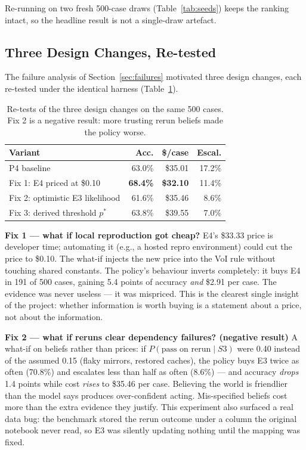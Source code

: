 \documentclass{article}
\begin{document}
Re-running on two fresh 500-case draws (Table~\ref{tab:seeds}) keeps the ranking intact, so the headline result is not a single-draw artefact.

\subsection{Three Design Changes, Re-tested}

The failure analysis of Section~\ref{sec:failures} motivated three design changes, each re-tested under the identical harness (Table~\ref{tab:whatif}).

\begin{table}[t]
\centering
\small
\begin{tabular}{lrrr}
\toprule
Variant & Acc. & \$/case & Escal. \\
\midrule
P4 baseline & 63.0\% & \$35.01 & 17.2\% \\
Fix 1: E4 priced at \$0.10 & \textbf{68.4\%} & \textbf{\$32.10} & 11.4\% \\
Fix 2: optimistic E3 likelihood & 61.6\% & \$35.46 & 8.6\% \\
Fix 3: derived threshold $p^*$ & 63.8\% & \$39.55 & 7.0\% \\
\bottomrule
\end{tabular}
\caption{Re-tests of the three design changes on the same 500 cases. Fix 2 is a negative result: more trusting rerun beliefs made the policy worse.}
\label{tab:whatif}
\end{table}

\textbf{Fix 1 --- what if local reproduction got cheap?} E4's \$33.33 price is developer time; automating it (e.g., a hosted repro environment) could cut the price to \$0.10. The what-if injects the new price into the VoI rule without touching shared constants. The policy's behaviour inverts completely: it buys E4 in 191 of 500 cases, gaining 5.4 points of accuracy \emph{and} \$2.91 per case. The evidence was never useless --- it was mispriced. This is the clearest single insight of the project: whether information is worth buying is a statement about a price, not about the information.

\textbf{Fix 2 --- what if reruns clear dependency failures? (negative result)} A what-if on beliefs rather than prices: if $P(\text{pass on rerun} \mid S3)$ were 0.40 instead of the assumed 0.15 (flaky mirrors, restored caches), the policy buys E3 twice as often (70.8\%) and escalates less than half as often (8.6\%) --- and accuracy \emph{drops} 1.4 points while cost \emph{rises} to \$35.46 per case. Believing the world is friendlier than the model says produces over-confident acting. Mis-specified beliefs cost more than the extra evidence they justify. This experiment also surfaced a real data bug: the benchmark stored the rerun outcome under a column the original notebook never read, so E3 was silently updating nothing until the mapping was fixed.
\end{document}
